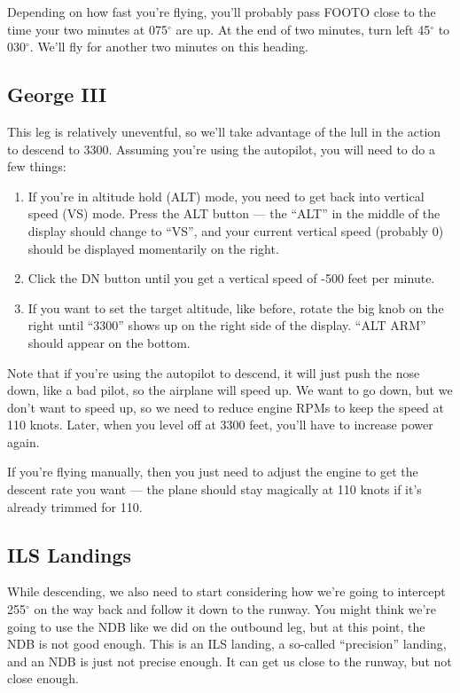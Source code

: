 Depending on how fast you're flying, you'll probably pass FOOTO close
to the time your two minutes at 075$^\circ$ are up.  At the end of two
minutes, turn left 45$^\circ$ to 030$^\circ$.  We'll fly for another
two minutes on this heading.

\subsection{George III}

This leg is relatively uneventful, so we'll take advantage of the lull
in the action to descend to 3300.  Assuming you're using the
autopilot, you will need to do a few things:

\begin{enumerate}
\item If you're in altitude hold (ALT) mode, you need to get back into
  vertical speed (VS) mode.  Press the ALT button --- the ``ALT'' in
  the middle of the display should change to ``VS'', and your current
  vertical speed (probably 0) should be displayed momentarily on the
  right.
\item Click the DN button until you get a vertical speed of -500 feet
  per minute.
\item If you want to set the target altitude, like before, rotate the
  big knob on the right until ``3300'' shows up on the right side of
  the display.  ``ALT ARM'' should appear on the bottom.
\end{enumerate}

Note that if you're using the autopilot to descend, it will just push
the nose down, like a bad pilot, so the airplane will speed up.  We
want to go down, but we don't want to speed up, so we need to reduce
engine RPMs to keep the speed at 110 knots.  Later, when you level off
at 3300 feet, you'll have to increase power again.

If you're flying manually, then you just need to adjust the engine to
get the descent rate you want --- the plane should stay magically at
110 knots if it's already trimmed for 110.

\subsection{ILS Landings}

While descending, we also need to start considering how we're going to
intercept 255$^\circ$ on the way back and follow it down to the
runway.  You might think we're going to use the NDB like we did on the
outbound leg, but at this point, the NDB is not good enough.  This is
an ILS landing, a so-called ``precision'' landing, and an NDB is just
not precise enough.  It can get us close to the runway, but not close
enough.

